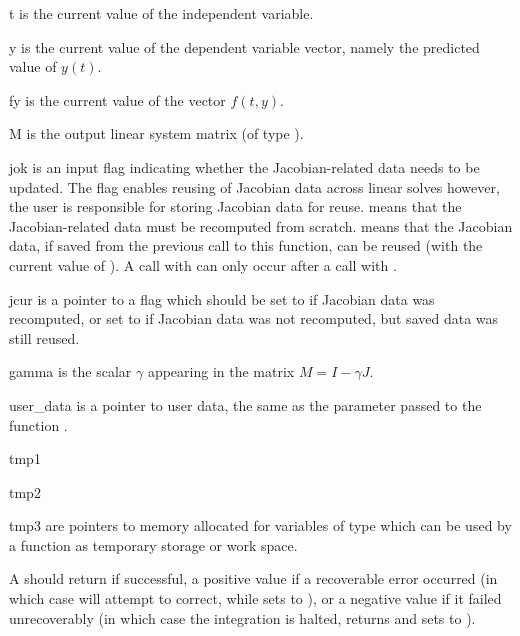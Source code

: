 {
  \begin{args}
  \item[t]
    is the current value of the independent variable.
  \item[y]
    is the current value of the dependent variable vector, namely the predicted
    value of $y(t)$.
  \item[fy]
    is the current value of the vector $f(t,y)$.
  \item[M]
    is the output linear system matrix (of type ).
  \item[jok]
    is an input flag indicating whether the Jacobian-related data needs to be
    updated. The  flag enables reusing of Jacobian data across linear
    solves however, the user is responsible for storing Jacobian data for
    reuse.  means that the Jacobian-related data must be
    recomputed from scratch.   means that the Jacobian data,
    if saved from the previous call to this function, can be reused (with the
    current value of ). A call with  can only occur
    after a call with .
  \item[jcur]
    is a pointer to a flag which should be set to  if Jacobian data
    was recomputed, or set to  if Jacobian data was not recomputed,
    but saved data was still reused.
  \item[gamma]
    is the scalar $\gamma$ appearing in the matrix $M = I - \gamma J$.
  \item[user\_data]
    is a pointer to user data, the same as the  parameter passed
    to the function .
  \item[tmp1]
  \item[tmp2]
  \item[tmp3]
    are pointers to memory allocated for variables of type  which
    can be used by a  function as temporary storage or work
    space.
  \end{args}
}
{
  A  should return  if successful, a positive value if a
  recoverable error occurred (in which case {\cvode} will attempt to correct,
  while {\cvls} sets  to ), or a
  negative value if it failed unrecoverably (in which case the integration is
  halted,  returns  and {\cvls} sets
   to ).
}
{}



